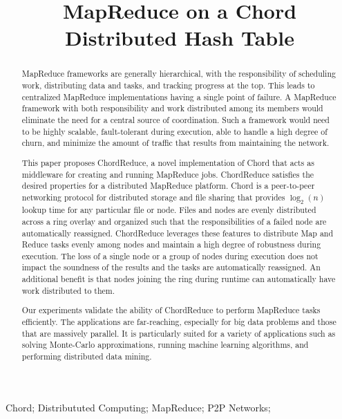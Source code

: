 \documentclass[conference, compsocconf, letterpaper]{IEEEtran}
\title{MapReduce on a Chord Distributed Hash Table}
\author{\IEEEauthorblockN{Andrew Rosen \qquad Brendan Benshoof \qquad Matt Erwin \qquad Robert Harrison \qquad Anu Bourgeois}
\IEEEauthorblockA{Department of Computer Science\\
Georgia State University\\
Atlanta, Georgia\\
rosen@cs.gsu.edu}
}
\begin{document}
\maketitle

\begin{abstract}

MapReduce frameworks are generally hierarchical, with the responsibility of scheduling work, distributing data and tasks, and tracking progress at the top.  This leads to centralized MapReduce implementations having a single point of failure.  A MapReduce framework with both responsibility and work distributed among its members would eliminate the need for a central source of coordination.  Such a framework would need to be highly scalable, fault-tolerant during execution, able to handle a high degree of churn, and minimize the amount of traffic that results from maintaining the network. 

This paper proposes ChordReduce, a novel implementation of Chord that acts as middleware for creating and running MapReduce jobs. ChordReduce satisfies the desired properties for a distributed MapReduce platform. Chord is a peer-to-peer networking protocol for distributed storage and file sharing that provides $\log_{2}(n)$ lookup time for any particular file or node.  Files and nodes are evenly distributed across a ring overlay and organized such that the responsibilities of a failed node are automatically reassigned.  ChordReduce leverages these features to distribute Map and Reduce tasks evenly among nodes and maintain a high degree of robustness during execution.  The loss of a single node or a group of nodes during execution does not impact the soundness of the results and the tasks are automatically reassigned.  An additional benefit is that nodes joining the ring during runtime can automatically have work distributed to them.

Our experiments validate the ability of ChordReduce to perform MapReduce tasks efficiently. The applications are far-reaching, especially for big data problems and those that are massively parallel.  It is particularly suited for a variety of applications such as solving Monte-Carlo approximations, running machine learning algorithms, and performing distributed data mining. 


\end{abstract}


\begin{IEEEkeywords}
Chord; Distribututed Computing; MapReduce; P2P Networks;

\end{IEEEkeywords}
\end{document}
